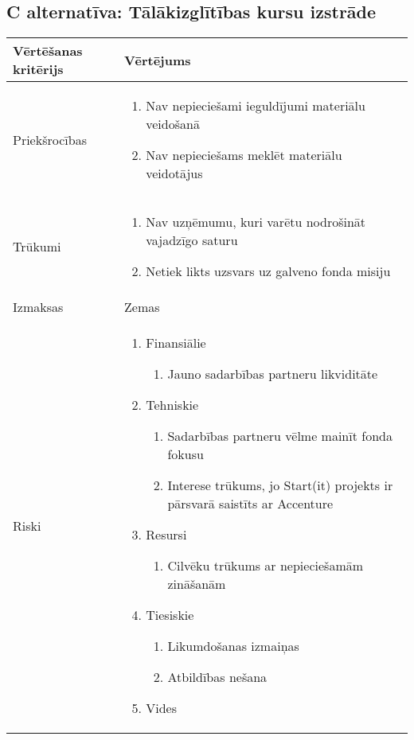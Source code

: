 \subsection*{C alternatīva: Tālākizglītības kursu izstrāde}
\begin{table}[!ht]
    \centering
    \begin{tabular}{|l|p{11.5cm}|}
        \hline
        \textbf{Vērtēšanas kritērijs} & \textbf{Vērtējums} \\
        \hline
        Priekšrocības & \begin{enumerate}
            \item Nav nepieciešami ieguldījumi materiālu veidošanā
            \item Nav nepieciešams meklēt materiālu veidotājus
        \end{enumerate} \\
        \hline 
        Trūkumi &  \begin{enumerate}
            \item Nav uzņēmumu, kuri varētu nodrošināt vajadzīgo saturu
            \item Netiek likts uzsvars uz galveno fonda misiju
        \end{enumerate}\\
        \hline 
        Izmaksas & Zemas \\
        \hline
        Riski &  \begin{enumerate}
            \item Finansiālie
            \begin{enumerate}
                \item Jauno sadarbības partneru likviditāte
            \end{enumerate}
            \item Tehniskie
            \begin{enumerate}
                \item Sadarbības partneru vēlme mainīt fonda fokusu
                \item Interese trūkums, jo Start(it) projekts ir pārsvarā saistīts ar Accenture
            \end{enumerate}
            \item Resursi
            \begin{enumerate}
                \item Cilvēku trūkums ar nepieciešamām zināšanām
            \end{enumerate}
            \item Tiesiskie
            \begin{enumerate}
                \item Likumdošanas izmaiņas
                \item Atbildības nešana
            \end{enumerate}
            \item Vides
        \end{enumerate}\\
        \hline
    \end{tabular}
\end{table}
\clearpage